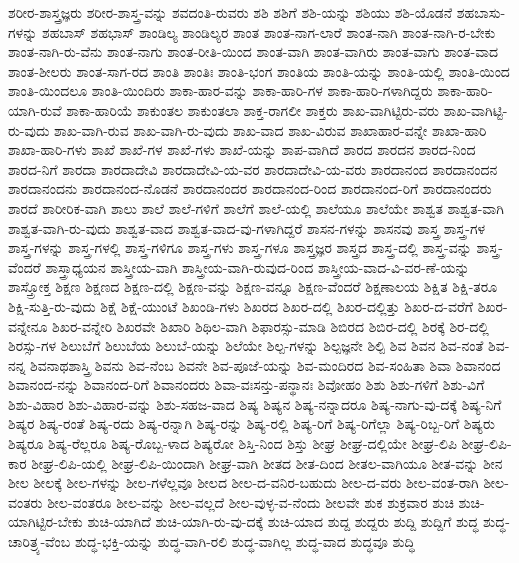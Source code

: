 {ಶರೀರ-ಶಾಸ್ತ್ರಜ್ಞರು
ಶರೀರ-ಶಾಸ್ತ್ರ-ವನ್ನು
ಶವದಂತಿ-ರುವರು
ಶಶಿ
ಶಶಿಗೆ
ಶಶಿ-ಯನ್ನು
ಶಶಿಯು
ಶಶಿ-ಯೊಡನೆ
ಶಹಬಾಸು-ಗಳನ್ನು
ಶಹಬಾಸ್
ಶಹಭಾಸ್
ಶಾಂಡಿಲ್ಯ
ಶಾಂಡಿಲ್ಯರ
ಶಾಂತ
ಶಾಂತ-ನಾಗ-ಲಾರೆ
ಶಾಂತ-ನಾಗಿ
ಶಾಂತ-ನಾಗಿ-ರ-ಬೇಕು
ಶಾಂತ-ನಾಗಿ-ರು-ವೆನು
ಶಾಂತ-ನಾಗು
ಶಾಂತ-ರೀತಿ-ಯಿಂದ
ಶಾಂತ-ವಾಗಿ
ಶಾಂತ-ವಾಗಿರು
ಶಾಂತ-ವಾಗು
ಶಾಂತ-ವಾದ
ಶಾಂತ-ಶೀಲರು
ಶಾಂತ-ಸಾಗ-ರದ
ಶಾಂತಿ
ಶಾಂತಿಃ
ಶಾಂತಿ-ಭಂಗ
ಶಾಂತಿಯ
ಶಾಂತಿ-ಯನ್ನು
ಶಾಂತಿ-ಯಲ್ಲಿ
ಶಾಂತಿ-ಯಿಂದ
ಶಾಂತಿ-ಯಿಂದಲೂ
ಶಾಂತಿ-ಯಿಂದಿರು
ಶಾಕಾ-ಹಾರ-ವನ್ನು
ಶಾಕಾ-ಹಾರಿ-ಗಳ
ಶಾಕಾ-ಹಾರಿ-ಗಳಾಗಿದ್ದರು
ಶಾಕಾ-ಹಾರಿ-ಯಾಗಿ-ರುವೆ
ಶಾಕಾ-ಹಾರಿಯೆ
ಶಾಕುಂತಲ
ಶಾಕುಂತಲಾ
ಶಾಕ್ತ-ರಾಗಲೀ
ಶಾಕ್ತರು
ಶಾಖ-ವಾಗಿಟ್ಟಿರು-ವರು
ಶಾಖ-ವಾಗಿಟ್ಟಿ-ರು-ವುದು
ಶಾಖ-ವಾಗಿ-ರುವ
ಶಾಖ-ವಾಗಿ-ರು-ವುದು
ಶಾಖ-ವಾದ
ಶಾಖ-ವಿರುವ
ಶಾಖಾಹಾರ-ವನ್ನೇ
ಶಾಖಾ-ಹಾರಿ
ಶಾಖಾ-ಹಾರಿ-ಗಳು
ಶಾಖೆ
ಶಾಖೆ-ಗಳ
ಶಾಖೆ-ಗಳು
ಶಾಖೆ-ಯನ್ನು
ಶಾಪ-ವಾಗಿದೆ
ಶಾರದ
ಶಾರದನ
ಶಾರದ-ನಿಂದ
ಶಾರದ-ನಿಗೆ
ಶಾರದಾ
ಶಾರದಾದೇವಿ
ಶಾರದಾದೇವಿ-ಯ-ವರ
ಶಾರದಾದೇವಿ-ಯ-ವರು
ಶಾರದಾನಂದ
ಶಾರದಾನಂದನ
ಶಾರದಾನಂದನು
ಶಾರದಾನಂದ-ನೊಡನೆ
ಶಾರದಾನಂದರ
ಶಾರದಾನಂದ-ರಿಂದ
ಶಾರದಾನಂದ-ರಿಗೆ
ಶಾರದಾನಂದರು
ಶಾರದೆ
ಶಾರೀರಿಕ-ವಾಗಿ
ಶಾಲು
ಶಾಲೆ
ಶಾಲೆ-ಗಳಿಗೆ
ಶಾಲೆಗೆ
ಶಾಲೆ-ಯಲ್ಲಿ
ಶಾಲೆಯೂ
ಶಾಲೆಯೇ
ಶಾಶ್ವತ
ಶಾಶ್ವತ-ವಾಗಿ
ಶಾಶ್ವತ-ವಾಗಿ-ರು-ವುದು
ಶಾಶ್ವತ-ವಾದ
ಶಾಶ್ವತ-ವಾದ-ವು-ಗಳಾಗಿದ್ದರೆ
ಶಾಸನ-ಗಳನ್ನು
ಶಾಸನವು
ಶಾಸ್ತ್ರ
ಶಾಸ್ತ್ರ-ಗಳ
ಶಾಸ್ತ್ರ-ಗಳನ್ನು
ಶಾಸ್ತ್ರ-ಗಳಲ್ಲಿ
ಶಾಸ್ತ್ರ-ಗಳಿಗೂ
ಶಾಸ್ತ್ರ-ಗಳು
ಶಾಸ್ತ್ರ-ಗಳೂ
ಶಾಸ್ತ್ರಜ್ಞರ
ಶಾಸ್ತ್ರದ
ಶಾಸ್ತ್ರ-ದಲ್ಲಿ
ಶಾಸ್ತ್ರ-ವನ್ನು
ಶಾಸ್ತ್ರ-ವೆಂದರೆ
ಶಾಸ್ತ್ರಾಧ್ಯಯನ
ಶಾಸ್ತ್ರೀಯ-ವಾಗಿ
ಶಾಸ್ತ್ರೀಯ-ವಾಗಿ-ರುವುದ-ರಿಂದ
ಶಾಸ್ತ್ರೀಯ-ವಾದ-ವಿ-ವರ-ಣೆ-ಯನ್ನು
ಶಾಸ್ತ್ರೋಕ್ತ
ಶಿಕ್ಷಣ
ಶಿಕ್ಷಣದ
ಶಿಕ್ಷಣ-ದಲ್ಲಿ
ಶಿಕ್ಷಣ-ವನ್ನು
ಶಿಕ್ಷಣ-ವನ್ನೂ
ಶಿಕ್ಷಣ-ವೆಂದರೆ
ಶಿಕ್ಷಣಾಲಯ
ಶಿಕ್ಷಿತ
ಶಿಕ್ಷಿ-ತರೂ
ಶಿಕ್ಷಿ-ಸುತ್ತಿ-ರು-ವುದು
ಶಿಕ್ಷೆ
ಶಿಕ್ಷೆ-ಯುಂಟೆ
ಶಿಖಂಡಿ-ಗಳು
ಶಿಖರದ
ಶಿಖರ-ದಲ್ಲಿ
ಶಿಖರ-ದಲ್ಲಿತ್ತು
ಶಿಖರ-ದ-ವರೆಗೆ
ಶಿಖರ-ವನ್ನೇನೂ
ಶಿಖರ-ವನ್ನೇರಿ
ಶಿಖರವೇ
ಶಿಖಾರಿ
ಶಿಥಿಲ-ವಾಗಿ
ಶಿಫಾರಸ್ಸು-ಮಾಡಿ
ಶಿಬಿರದ
ಶಿಬಿರ-ದಲ್ಲಿ
ಶಿರಕ್ಕೆ
ಶಿರ-ದಲ್ಲಿ
ಶಿರಸ್ಸು-ಗಳ
ಶಿಲುಬೆಗೆ
ಶಿಲುಬೆಯ
ಶಿಲುಬೆ-ಯನ್ನು
ಶಿಲೆಯೇ
ಶಿಲ್ಪ-ಗಳನ್ನು
ಶಿಲ್ಪಜ್ಞನೇ
ಶಿಲ್ಪಿ
ಶಿವ
ಶಿವನ
ಶಿವ-ನಂತೆ
ಶಿವ-ನನ್ನ
ಶಿವನಾಥಶಾಸ್ತ್ರಿ
ಶಿವನು
ಶಿವ-ನೆಂಬ
ಶಿವನೇ
ಶಿವ-ಪೂಜೆ-ಯನ್ನು
ಶಿವ-ಮಂದಿರದ
ಶಿವ-ಸಂಹಿತಾ
ಶಿವಾ
ಶಿವಾನಂದ
ಶಿವಾನಂದ-ನನ್ನು
ಶಿವಾನಂದ-ರಿಗೆ
ಶಿವಾನಂದರು
ಶಿವಾ-ವಃಸನ್ತು-ಪನ್ಥಾನಃ
ಶಿವೋಹಂ
ಶಿಶು
ಶಿಶು-ಗಳಿಗೆ
ಶಿಶು-ವಿಗೆ
ಶಿಶು-ವಿಹಾರ
ಶಿಶು-ವಿಹಾರ-ವನ್ನು
ಶಿಶು-ಸಹಜ-ವಾದ
ಶಿಷ್ಯ
ಶಿಷ್ಯನ
ಶಿಷ್ಯ-ನನ್ನಾದರೂ
ಶಿಷ್ಯ-ನಾಗು-ವು-ದಕ್ಕೆ
ಶಿಷ್ಯ-ನಿಗೆ
ಶಿಷ್ಯರ
ಶಿಷ್ಯ-ರಂತೆ
ಶಿಷ್ಯ-ರದು
ಶಿಷ್ಯ-ರನ್ನಾಗಿ
ಶಿಷ್ಯ-ರನ್ನು
ಶಿಷ್ಯ-ರಲ್ಲಿ
ಶಿಷ್ಯ-ರಿಗೆ
ಶಿಷ್ಯ-ರಿಗೆಲ್ಲಾ
ಶಿಷ್ಯ-ರಿಬ್ಬ-ರಿಗೆ
ಶಿಷ್ಯರು
ಶಿಷ್ಯರೂ
ಶಿಷ್ಯ-ರೆಲ್ಲರೂ
ಶಿಷ್ಯ-ರೊಬ್ಬ-ಳಾದ
ಶಿಷ್ಯರೋ
ಶಿಸ್ತಿ-ನಿಂದ
ಶಿಸ್ತು
ಶೀಘ್ರ
ಶೀಘ್ರ-ದಲ್ಲಿಯೇ
ಶೀಘ್ರ-ಲಿಪಿ
ಶೀಘ್ರ-ಲಿಪಿ-ಕಾರ
ಶೀಘ್ರ-ಲಿಪಿ-ಯಲ್ಲಿ
ಶೀಘ್ರ-ಲಿಪಿ-ಯಿಂದಾಗಿ
ಶೀಘ್ರ-ವಾಗಿ
ಶೀತದ
ಶೀತ-ದಿಂದ
ಶೀತಲ-ವಾಗಿಯೂ
ಶೀತ-ವನ್ನು
ಶೀನ
ಶೀಲ
ಶೀಲಕ್ಕೆ
ಶೀಲ-ಗಳನ್ನು
ಶೀಲ-ಗಳೆಲ್ಲವೂ
ಶೀಲದ
ಶೀಲ-ದ-ವನಿರ-ಬಹುದು
ಶೀಲ-ದ-ವರು
ಶೀಲ-ವಂತ-ರಾಗಿ
ಶೀಲ-ವಂತರು
ಶೀಲ-ವಂತರೂ
ಶೀಲ-ವನ್ನು
ಶೀಲ-ವಲ್ಲದೆ
ಶೀಲ-ವುಳ್ಳ-ವ-ನೆಂದು
ಶೀಲವೇ
ಶುಕ
ಶುಕ್ರವಾರ
ಶುಚಿ
ಶುಚಿ-ಯಾಗಿಟ್ಟಿರ-ಬೇಕು
ಶುಚಿ-ಯಾಗಿದೆ
ಶುಚಿ-ಯಾಗಿ-ರು-ವು-ದಕ್ಕೆ
ಶುಚಿ-ಯಾದ
ಶುದ್ದ
ಶುದ್ದರು
ಶುದ್ದಿ
ಶುದ್ದಿಗೆ
ಶುದ್ಧ
ಶುದ್ಧ-ಚಾರಿತ್ರ್ಯ-ವೆಂಬ
ಶುದ್ಧ-ಭಕ್ತಿ-ಯನ್ನು
ಶುದ್ಧ-ವಾಗಿ-ರಲಿ
ಶುದ್ಧ-ವಾಗಿಲ್ಲ
ಶುದ್ಧ-ವಾದ
ಶುದ್ಧವೂ
ಶುದ್ಧಿ
}
